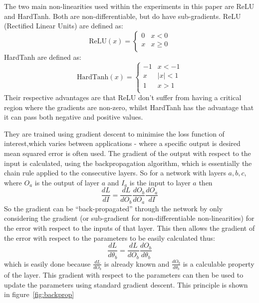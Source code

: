 The two main non-linearities used within the experiments in this paper are ReLU and HardTanh. Both are non-differentiable, but do have sub-gradients. ReLU (Rectified Linear Units) are defined as:
\begin{equation}
\text{ReLU}(x) = \begin{cases}
0 & x < 0 \\
x & x \ge 0 \\
\end{cases}
\end{equation}
HardTanh are defined as:
\begin{equation}
\text{HardTanh}(x) = \begin{cases}
-1 & x < -1 \\
x & |x| < 1 \\
1 & x > 1 \\
\end{cases}
\end{equation}
Their respective advantages are that ReLU don't suffer from having a critical region where the gradients are non-zero, whilst HardTanh has the advantage that it can pass both negative and positive values.

They are trained using gradient descent to minimise the loss function of interest,which varies between applications - where a specific output is desired mean squared error is often used. The gradient of the output with respect to the input is calculated, using the backpropagation algorithm, which is essentially the chain rule applied to the consecutive layers. So for a network with layers $a, b, c$, where $O_a$ is the output of layer $a$ and $I_a$ is the input to layer $a$ then 
\begin{equation}
\frac{dL}{dI}  = \frac{dL}{dO_b} \frac{dO_b}{dO_a} \frac{dO_a}{dI} 
\end{equation} 
So the gradient can be ``back-propagated'' through the network by only considering the gradient (or sub-gradient for non-differentiable non-linearities) for the error with respect to the inputs of that layer. This then allows the gradient of the error with respect to the parameters to be easily calculated thus:
\begin{equation}
\frac{dL}{d\theta_b} = \frac{dL}{dO_b}\frac{dO_b}{d\theta_b} 
\end{equation}
which is easily done because $\frac{dL}{dO_b}$ is already known and $\frac{dO_b}{d\theta_b}$ is a calculable property of the layer. This gradient with respect to the parameters can then be used to update the parameters using standard gradient descent. This principle is shown in figure~\ref{fig:backprop}

